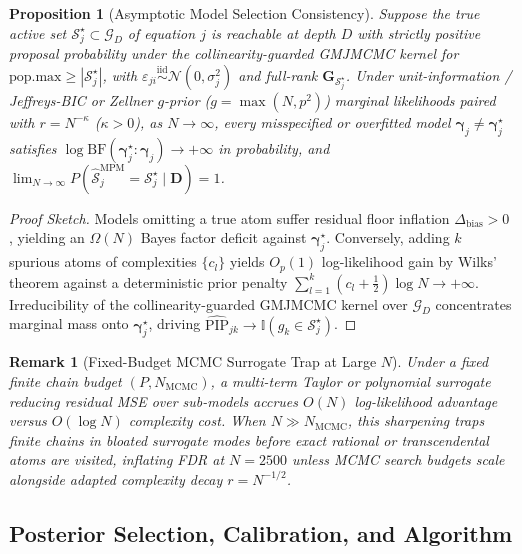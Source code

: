 \documentclass{article}
\newtheorem{proposition}{Proposition}
\newtheorem{remark}{Remark}
\begin{document}
\begin{proposition}[Asymptotic Model Selection Consistency]
Suppose the true active set $\mathcal{S}_j^\star \subset \mathcal{G}_D$ of equation $j$ is reachable at depth $D$ with strictly positive proposal probability under the collinearity-guarded GMJMCMC kernel for $\text{pop.max} \ge |\mathcal{S}_j^\star|$, with $\varepsilon_{ji} \stackrel{\text{iid}}{\sim} \mathcal{N}(0, \sigma_j^2)$ and full-rank $\boldsymbol{G}_{\mathcal{S}_j^\star}$. Under unit-information / Jeffreys-BIC or Zellner $g$-prior ($g=\max(N,p^2)$) marginal likelihoods paired with $r = N^{-\kappa}$ ($\kappa > 0$), as $N \to \infty$, every misspecified or overfitted model $\boldsymbol{\gamma}_j \neq \boldsymbol{\gamma}_j^\star$ satisfies $\log \mathrm{BF}(\boldsymbol{\gamma}_j^\star : \boldsymbol{\gamma}_j) \to +\infty$ in probability, and $\lim_{N\to\infty} P(\hat{\mathcal{S}}_j^{\text{MPM}} = \mathcal{S}_j^\star \mid \boldsymbol{D}) = 1$.
\end{proposition}

\begin{proof}[Proof Sketch]
Models omitting a true atom suffer residual floor inflation $\Delta_{\text{bias}} > 0$, yielding an $\Omega(N)$ Bayes factor deficit against $\boldsymbol{\gamma}_j^\star$. Conversely, adding $k$ spurious atoms of complexities $\{c_l\}$ yields $O_p(1)$ log-likelihood gain by Wilks' theorem against a deterministic prior penalty $\sum_{l=1}^k (c_l + \tfrac{1}{2})\log N \to +\infty$. Irreducibility of the collinearity-guarded GMJMCMC kernel over $\mathcal{G}_D$ concentrates marginal mass onto $\boldsymbol{\gamma}_j^\star$, driving $\widehat{\text{PIP}}_{jk} \to \mathbb{I}(g_k \in \mathcal{S}_j^\star)$.
\end{proof}

\begin{remark}[Fixed-Budget MCMC Surrogate Trap at Large $N$]
Under a fixed finite chain budget $(P, N_{\text{MCMC}})$, a multi-term Taylor or polynomial surrogate reducing residual MSE over sub-models accrues $O(N)$ log-likelihood advantage versus $O(\log N)$ complexity cost. When $N \gg N_{\text{MCMC}}$, this sharpening traps finite chains in bloated surrogate modes before exact rational or transcendental atoms are visited, inflating FDR at $N=2500$ unless MCMC search budgets scale alongside adapted complexity decay $r = N^{-1/2}$.
\end{remark}

\subsection{Posterior Selection, Calibration, and Algorithm}
\end{document}
